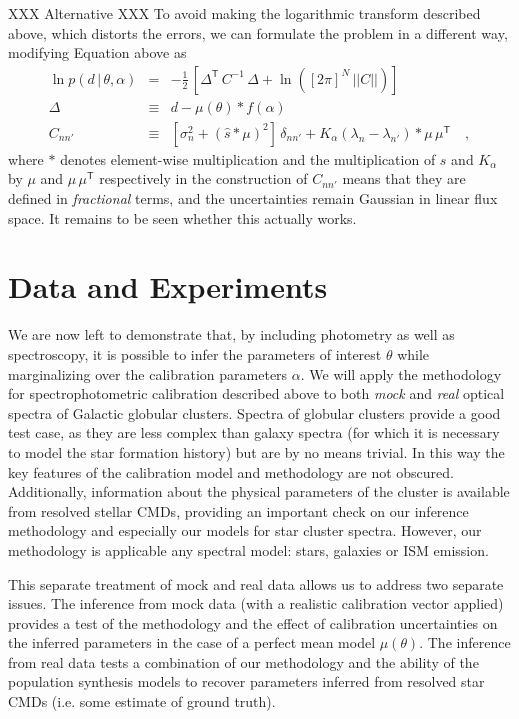 \documentclass[iop,numberedappendix]{emulateapj}
\newcommand{\transpose}[1]{{#1}^{\!\mathsf T}}
\newcommand{\given}{\,|\,}
\renewcommand{\det}[1]{||{#1}||}
\begin{document}
XXX Alternative XXX
To avoid making the logarithmic transform described above, which
distorts the errors, we can formulate the problem in a different way,
modifying Equation \label{eq:spectroscopicLF} above as 
\begin{eqnarray}\label{eq:spectroscopicLF_v2}
\ln p(d\given\theta,\alpha) &=&
                                -\frac{1}{2}\,\left[\transpose{\Delta}\,C^{-1}\,\Delta
                                + \ln([2\pi]^N\,\det{C}) \right]
\\
\Delta &\equiv& d - \mu(\theta) * f(\alpha) 
\\
C_{nn'} &\equiv& [\sigma_n^2 + (\hat{s} * \mu)^2]\,\delta_{nn'} +
 K_\alpha(\lambda_n - \lambda_{n'}) \ast \mu \, \transpose{\mu}
\quad ,
\end{eqnarray}
where $\ast$ denotes element-wise multiplication and the
multiplication of $s$ and $K_\alpha$ by $\mu$ and
$\mu\,\transpose{\mu}$ respectively in the construction of $C_{nn'}$
means that they are defined in \emph{fractional} terms, and the
uncertainties remain Gaussian in linear flux space.  It remains to be
seen whether this actually works.


\section{Data and Experiments}

We are now left to demonstrate that, by including photometry as well
as spectroscopy, it is possible to infer the parameters of interest
$\theta$ while marginalizing over the calibration parameters $\alpha$.
We will apply the methodology for spectrophotometric calibration
described above to both \emph{mock} and \emph{real} optical spectra of
Galactic globular clusters.  Spectra of globular clusters provide a
good test case, as they are less complex than galaxy spectra (for
which it is necessary to model the star formation history) but are by
no means trivial. In this way the key features of the calibration
model and methodology are not obscured.  Additionally, information
about the physical parameters of the cluster is available from
resolved stellar CMDs, providing an important check on our inference
methodology and especially our models for star cluster spectra.  However,
our methodology is applicable any spectral model: stars, galaxies or
ISM emission.

This separate treatment of mock and real data allows us to address two
separate issues.  The inference from mock data (with a realistic
calibration vector applied) provides a test of the methodology and the
effect of calibration uncertainties on the inferred parameters in the
case of a perfect mean model $\mu(\theta)$.  The inference from real
data tests a combination of our methodology and the ability of the
population synthesis models to recover parameters inferred from
resolved star CMDs (i.e. some estimate of ground truth).
\end{document}
